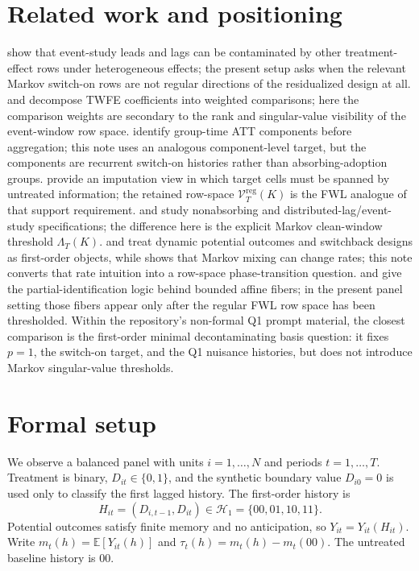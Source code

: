 \documentclass[11pt]{article}
\newcommand{\E}{\mathbb{E}}
\theoremstyle{definition}
\theoremstyle{plain}
\theoremstyle{remark}
\begin{document}
\section{Related work and positioning}
\cite{sunabraham2021eventstudy} show that event-study leads and lags can be contaminated by other treatment-effect rows under heterogeneous effects; the present setup asks when the relevant Markov switch-on rows are not regular directions of the residualized design at all.
\cite{dechaisemartin2020twfe} and \cite{goodmanbacon2021timing} decompose TWFE coefficients into weighted comparisons; here the comparison weights are secondary to the rank and singular-value visibility of the event-window row space.
\cite{callaway2021multiple} identify group-time ATT components before aggregation; this note uses an analogous component-level target, but the components are recurrent switch-on histories rather than absorbing-adoption groups.
\cite{borusyak2024eventstudy} provide an imputation view in which target cells must be spanned by untreated information; the retained row-space \(\mathcal V_T^{\mathrm{reg}}(K)\) is the FWL analogue of that support requirement.
\cite{dechaisemartin2024intertemporal} and \cite{schmidheiny2023event} study nonabsorbing and distributed-lag/event-study specifications; the difference here is the explicit Markov clean-window threshold \(\Lambda_T(K)\).
\cite{bojinov2021panel} and \cite{bojinov2023switchback} treat dynamic potential outcomes and switchback designs as first-order objects, while \cite{hu2022switchback} shows that Markov mixing can change rates; this note converts that rate intuition into a row-space phase-transition question.
\cite{manski2003partial} and \cite{tamer2010partial} give the partial-identification logic behind bounded affine fibers; in the present panel setting those fibers appear only after the regular FWL row space has been thresholded.
Within the repository's non-formal Q1 prompt material, the closest comparison is the first-order minimal decontaminating basis question: it fixes \(p=1\), the switch-on target, and the Q1 nuisance histories, but does not introduce Markov singular-value thresholds.

\section{Formal setup}
We observe a balanced panel with units \(i=1,\ldots,N\) and periods \(t=1,\ldots,T\).
Treatment is binary, \(D_{it}\in\{0,1\}\), and the synthetic boundary value \(D_{i0}=0\) is used only to classify the first lagged history.
The first-order history is
\[
H_{it}=(D_{i,t-1},D_{it})\in\mathcal H_1=\{00,01,10,11\}.
\]
Potential outcomes satisfy finite memory and no anticipation, so \(Y_{it}=Y_{it}(H_{it})\).
Write \(m_t(h)=\E[Y_{it}(h)]\) and \(\tau_t(h)=m_t(h)-m_t(00)\).
The untreated baseline history is \(00\).
\end{document}
